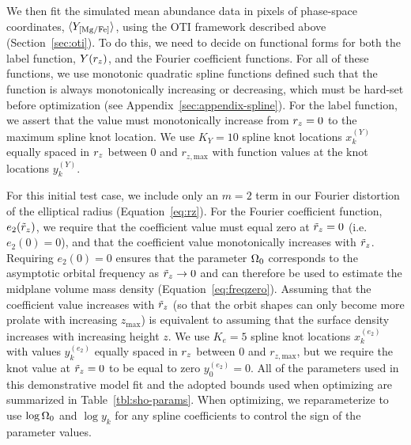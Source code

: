 We then fit the simulated mean abundance data in pixels of phase-space coordinates,
$\langle Y_{{[\mathrm{Mg}/\mathrm{Fe}]}} \rangle$, using the OTI framework described above
(Section~\ref{sec:oti}).
To do this, we need to decide on functional forms for both the label function, $Y(r_z)$,
and the Fourier coefficient functions.
For all of these functions, we use monotonic quadratic spline functions defined such
that the function is always monotonically increasing or decreasing, which must be
hard-set before optimization (see Appendix~\ref{sec:appendix-spline}).
For the label function, we assert that the value must monotonically increase from $r_z =
0$ to the maximum spline knot location.
We use $K_Y=10$ spline knot locations $x_k^{(Y)}$ equally spaced in $r_z$ between $0$
and $r_{z, \textrm{max}}$ with function values at the knot locations $y_k^{(Y)}$.

For this initial test case, we include only an $m=2$ term in our Fourier distortion of
the elliptical radius (Equation~\ref{eq:rz}).
For the Fourier coefficient function, $e_2(\tilde{r}_z)$, we require that the coefficient value
must equal zero at $\tilde{r}_z = 0$ (i.e. $e_2(0) = 0$), and that the coefficient value
monotonically increases with $\tilde{r}_z$.
Requiring $e_2(0) = 0$ ensures that the parameter $\Omega_0$ corresponds to the
asymptotic orbital frequency as $\tilde{r}_z \rightarrow 0$ and can therefore be used to
estimate the midplane volume mass density (Equation~\ref{eq:freqzero}).
Assuming that the coefficient value increases with $\tilde{r}_z$ (so that the orbit shapes
can only become more prolate with increasing $z_{\textrm{max}}$) is equivalent to
assuming that the surface density increases with increasing height $z$.
We use $K_e=5$ spline knot locations $x_k^{(e_2)}$ with values $y_k^{(e_2)}$ equally
spaced in $r_z$ between $0$ and $r_{z, \textrm{max}}$, but we require the knot value at
$\tilde{r}_z = 0$ to be equal to zero $y_0^{(e_2)}=0$.
All of the parameters used in this demonstrative model fit and the adopted bounds used
when optimizing are summarized in Table~\ref{tbl:sho-params}.
When optimizing, we reparameterize to use $\log \Omega_0$ and $\log y_k$ for any spline
coefficients to control the sign of the parameter values.

